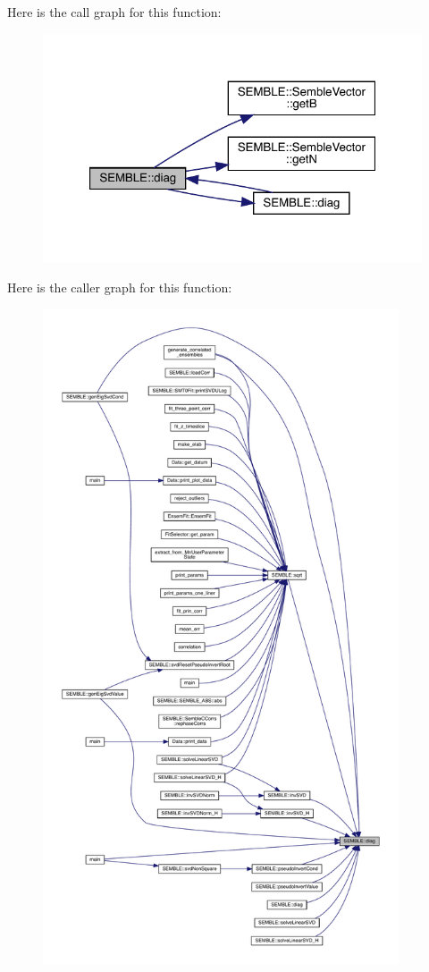Here is the call graph for this function\+:
\nopagebreak
\begin{figure}[H]
\begin{center}
\leavevmode
\includegraphics[width=321pt]{d7/dfd/namespaceSEMBLE_a03aa1c70ca93395c3c1c0c43801121d7_cgraph}
\end{center}
\end{figure}
Here is the caller graph for this function\+:
\nopagebreak
\begin{figure}[H]
\begin{center}
\leavevmode
\includegraphics[height=550pt]{d7/dfd/namespaceSEMBLE_a03aa1c70ca93395c3c1c0c43801121d7_icgraph}
\end{center}
\end{figure}
\mbox{\label{namespaceSEMBLE_abf12d64435d2a9f32a96af271832a48f}} 
